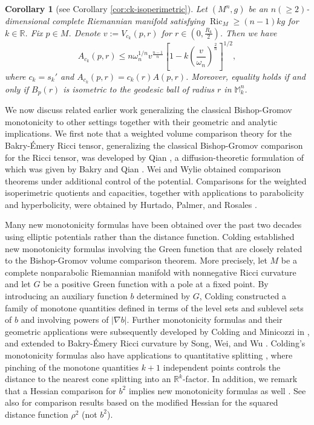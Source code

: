 \documentclass[11pt]{article}
\newtheorem{corollary}[theorem]{Corollary}
\newcommand{\Ric}{\operatorname{Ric}}
\begin{document}
\begin{corollary}[see Corollary \ref{cor:ck-isoperimetric}]
Let $(M^n,g)$ be an $n(\geq 2)$-dimensional complete Riemannian manifold satisfying $\Ric_M\geq(n-1)kg$ for $k \in \mathbb{R}$. Fix \(p\in M\). Denote $v:=V_{c_k}(p,r)$ for $r \in (0, \frac{R_k}{2})$. Then we have
\[
A_{c_k}(p,r)
\leq
n\omega_n^{1/n}
v^{\frac{n-1}{n}}
\left[
1-
k\left(
\frac{v}{\omega_n}
\right)^{\frac{2}{n}}
\right]^{1/2},
\]
where $c_k=s_k'$ and $A_{c_k}(p,r)=c_k(r)A(p,r)$. Moreover, equality holds if and only if $B_p(r)$ is isometric to the geodesic ball of radius $r$ in $\mathbb{M}_k^n$.	
\end{corollary}

We now discuss related earlier work generalizing the classical Bishop-Gromov monotonicity to other settings together with their geometric and analytic implications. We first note that a weighted volume comparison theory for the Bakry-\'Emery Ricci tensor, generalizing the classical Bishop-Gromov comparison for the Ricci tensor, was developed by Qian \cite{Qian}, a diffusion-theoretic formulation of which was given by Bakry and Qian \cite{BakryQian}. Wei and Wylie \cite{WeiWylie} obtained comparison theorems under additional control of the potential. Comparisons for the weighted isoperimetric quotients and capacities, together with applications to parabolicity and hyperbolicity, were obtained by Hurtado, Palmer, and Rosales \cite{HurtadoPalmerRosales}.


Many new monotonicity formulas have been obtained over the past two decades using elliptic potentials rather than the distance function. Colding \cite{ColdingMonotonicity} established new monotonicity formulas involving the Green function that are closely related to the Bishop-Gromov volume comparison theorem. More precisely, let $M$ be a complete nonparabolic Riemannian manifold with nonnegative Ricci curvature and let $G$ be a positive Green function with a pole at a fixed point. By introducing an auxiliary function $b$ determined by $G$, Colding constructed a family of monotone quantities defined in terms of the level sets and sublevel sets of $b$ and involving powers of $|\nabla b|$. Further monotonicity formulas and their geometric applications were subsequently developed by Colding and Minicozzi in \cite{ColdingMinicozziSurvey,ColdingMinicozziHarmonic,ColdingMinicozziTangentCones}, and extended to Bakry-\'Emery Ricci curvature by Song, Wei, and Wu \cite{SongWeiWu}. Colding's monotonicity formulas also have applications to quantitative splitting \cite{BreinerPark}, where pinching of the monotone quantities $k+1$ independent points controls the distance to the nearest cone splitting into an $\mathbb{R}^k$-factor. In addition, we remark that a Hessian comparison for $b^2$ implies new monotonicity formulas as well \cite{Park}. See also \cite{Ng} for comparison results based on the modified Hessian for the squared distance function $\rho^2$ (not $b^2$).
\end{document}

